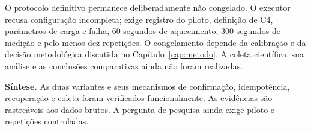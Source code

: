 O protocolo definitivo permanece deliberadamente não congelado. O executor recusa configuração incompleta; exige registro do piloto, definição de C4, parâmetros de carga e falha, 60 segundos de aquecimento, 300 segundos de medição e pelo menos dez repetições. O congelamento depende da calibração e da decisão metodológica discutida no Capítulo~\ref{cap:metodo}. A coleta científica, sua análise e as conclusões comparativas ainda não foram realizadas.

\textbf{Síntese.} As duas variantes e seus mecanismos de confirmação, idempotência, recuperação e coleta foram verificados funcionalmente. As evidências são rastreáveis aos dados brutos. A pergunta de pesquisa ainda exige piloto e repetições controladas.
